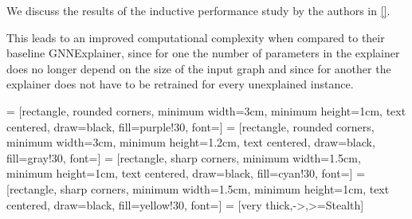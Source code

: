 We discuss the results of the inductive performance study by the authors in \ref{}.



This leads to an improved computational complexity when compared to their baseline GNNExplainer, since for one the number of parameters in the explainer does no longer depend on the size of the input graph and since for another the explainer does not have to be retrained for every unexplained instance.

 = [rectangle, rounded corners, minimum width=3cm, minimum height=1cm, text centered, draw=black, fill=purple!30, font=\small]
 = [rectangle, rounded corners, minimum width=3cm, minimum height=1.2cm, text centered, draw=black, fill=gray!30, font=\small]
 = [rectangle, sharp corners, minimum width=1.5cm, minimum height=1cm, text centered, draw=black, fill=cyan!30, font=\small]
 = [rectangle, sharp corners, minimum width=1.5cm, minimum height=1cm, text centered, draw=black, fill=yellow!30, font=\small]
 = [very thick,->,>=Stealth]    %

